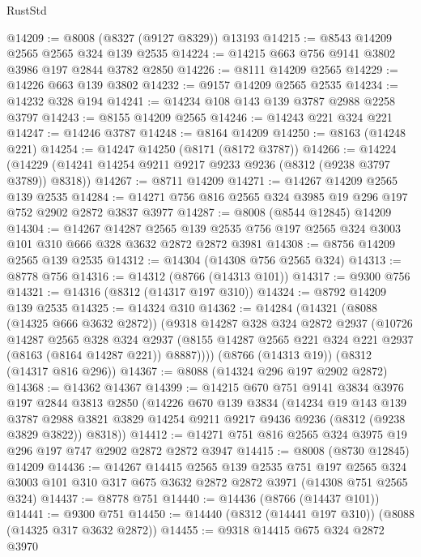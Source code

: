 \begin{lexlean}{RustStd}
\begin{coremodule}
@14209 := @8008 (@8327 (@9127 @8329)) @13193
@14215 := @8543 @14209 @2565 @2565 @324 @139 @2535
@14224 := @14215 @663 @756 @9141 @3802 @3986 @197 @2844 @3782 @2850
@14226 := @8111 @14209 @2565
@14229 := @14226 @663 @139 @3802
@14232 := @9157 @14209 @2565 @2535
@14234 := @14232 @328 @194
@14241 := @14234 @108 @143 @139 @3787 @2988 @2258 @3797
@14243 := @8155 @14209 @2565
@14246 := @14243 @221 @324 @221
@14247 := @14246 @3787
@14248 := @8164 @14209
@14250 := @8163 (@14248 @221)
@14254 := @14247 @14250 (@8171 (@8172 @3787))
@14266 := @14224 (@14229 (@14241 @14254 @9211 @9217 @9233 @9236 (@8312 (@9238 @3797 @3789)) @8318))
@14267 := @8711 @14209
@14271 := @14267 @14209 @2565 @139 @2535
@14284 := @14271 @756 @816 @2565 @324 @3985 @19 @296 @197 @752 @2902 @2872 @3837 @3977
@14287 := @8008 (@8544 @12845) @14209
@14304 := @14267
    @14287
    @2565
    @139
    @2535
    @756
    @197
    @2565
    @324
    @3003
    @101
    @310
    @666
    @328
    @3632
    @2872
    @2872
    @3981
@14308 := @8756 @14209 @2565 @139 @2535
@14312 := @14304 (@14308 @756 @2565 @324)
@14313 := @8778 @756
@14316 := @14312 (@8766 (@14313 @101))
@14317 := @9300 @756
@14321 := @14316 (@8312 (@14317 @197 @310))
@14324 := @8792 @14209 @139 @2535
@14325 := @14324 @310
@14362 := @14284
    (@14321
      (@8088 (@14325 @666 @3632 @2872))
      (@9318
        @14287
        @328
        @324
        @2872
        @2937
        (@10726
          @14287
          @2565
          @328
          @324
          @2937
          (@8155 @14287 @2565 @221 @324 @221 @2937 (@8163 (@8164 @14287 @221)) @8887))))
    (@8766 (@14313 @19))
    (@8312 (@14317 @816 @296))
@14367 := @8088 (@14324 @296 @197 @2902 @2872)
@14368 := @14362 @14367
@14399 := @14215
    @670
    @751
    @9141
    @3834
    @3976
    @197
    @2844
    @3813
    @2850
    (@14226
      @670
      @139
      @3834
      (@14234
        @19
        @143
        @139
        @3787
        @2988
        @3821
        @3829
        @14254
        @9211
        @9217
        @9436
        @9236
        (@8312 (@9238 @3829 @3822))
        @8318))
@14412 := @14271 @751 @816 @2565 @324 @3975 @19 @296 @197 @747 @2902 @2872 @2872 @3947
@14415 := @8008 (@8730 @12845) @14209
@14436 := @14267
    @14415
    @2565
    @139
    @2535
    @751
    @197
    @2565
    @324
    @3003
    @101
    @310
    @317
    @675
    @3632
    @2872
    @2872
    @3971
    (@14308 @751 @2565 @324)
@14437 := @8778 @751
@14440 := @14436 (@8766 (@14437 @101))
@14441 := @9300 @751
@14450 := @14440 (@8312 (@14441 @197 @310)) (@8088 (@14325 @317 @3632 @2872))
@14455 := @9318 @14415 @675 @324 @2872 @3970

\end{coremodule}
\end{lexlean}
